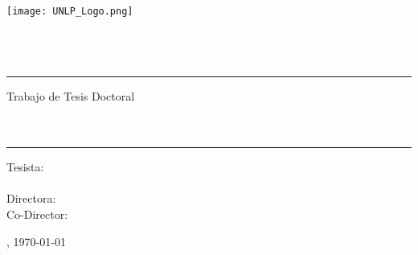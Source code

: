\pagestyle{empty}
	\begin{center}

		\texttt{[image: UNLP\_Logo.png]}\\[1.5cm]%

		{\LARGE \textsc{\myUni}}\\[0.3cm]
		{\Large \textsc{\myFaculty}}\\[0.3cm]
		{\Large \textsc{\myDepartment}}\\[2cm]

		\hrule
		{\Large Trabajo de Tesis Doctoral}\\[1cm]
		
		{\Huge \textbf{\myTitle}}\\[1cm] %
		{\Huge \textit{\mySubtitle}}\\[0.6cm]
		\hrule

		\vspace{1cm}

		{
			\Large
			Tesista:\\
			\myName
		}\\[1.5cm]

		{
			\Large
			Directora: \myProf\\
			Co-Director: \myOtherProf\\
		}

		\vfill
		\large \myLocation, \monthyeardate\today

	\end{center}
